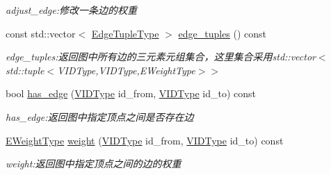 \begin{DoxyCompactItemize}
\begin{DoxyCompactList}\small\item\em adjust\+\_\+edge\+:修改一条边的权重 \end{DoxyCompactList}\item 
const std\+::vector$<$ \hyperlink{struct_introdunction_to_algorithm_1_1_graph_algorithm_1_1_matrix_graph_a73af3fee951b91b4f5c48422460f8c03}{Edge\+Tuple\+Type} $>$ \hyperlink{struct_introdunction_to_algorithm_1_1_graph_algorithm_1_1_matrix_graph_aa8d8cbe8e7d912681162c9d45ace5af2}{edge\+\_\+tuples} () const 
\begin{DoxyCompactList}\small\item\em edge\+\_\+tuples\+:返回图中所有边的三元素元组集合，这里集合采用{\ttfamily std\+::vector$<$std\+::tuple$<$V\+I\+D\+Type,V\+I\+D\+Type,E\+Weight\+Type$>$$>$} \end{DoxyCompactList}\item 
bool \hyperlink{struct_introdunction_to_algorithm_1_1_graph_algorithm_1_1_matrix_graph_adb7bcbdcc424af76ccb04225a3c83f04}{has\+\_\+edge} (\hyperlink{struct_introdunction_to_algorithm_1_1_graph_algorithm_1_1_matrix_graph_ae00582b52cc9f015cb9b1b8f4d521776}{V\+I\+D\+Type} id\+\_\+from, \hyperlink{struct_introdunction_to_algorithm_1_1_graph_algorithm_1_1_matrix_graph_ae00582b52cc9f015cb9b1b8f4d521776}{V\+I\+D\+Type} id\+\_\+to) const 
\begin{DoxyCompactList}\small\item\em has\+\_\+edge\+:返回图中指定顶点之间是否存在边 \end{DoxyCompactList}\item 
\hyperlink{struct_introdunction_to_algorithm_1_1_graph_algorithm_1_1_matrix_graph_af2d243f2c1bb8a101aa3f71f469c64e8}{E\+Weight\+Type} \hyperlink{struct_introdunction_to_algorithm_1_1_graph_algorithm_1_1_matrix_graph_ab194457255cc4ad47eaa91d630b4d3bb}{weight} (\hyperlink{struct_introdunction_to_algorithm_1_1_graph_algorithm_1_1_matrix_graph_ae00582b52cc9f015cb9b1b8f4d521776}{V\+I\+D\+Type} id\+\_\+from, \hyperlink{struct_introdunction_to_algorithm_1_1_graph_algorithm_1_1_matrix_graph_ae00582b52cc9f015cb9b1b8f4d521776}{V\+I\+D\+Type} id\+\_\+to) const 
\begin{DoxyCompactList}\small\item\em weight\+:返回图中指定顶点之间的边的权重 \end{DoxyCompactList}\end{DoxyCompactItemize}
